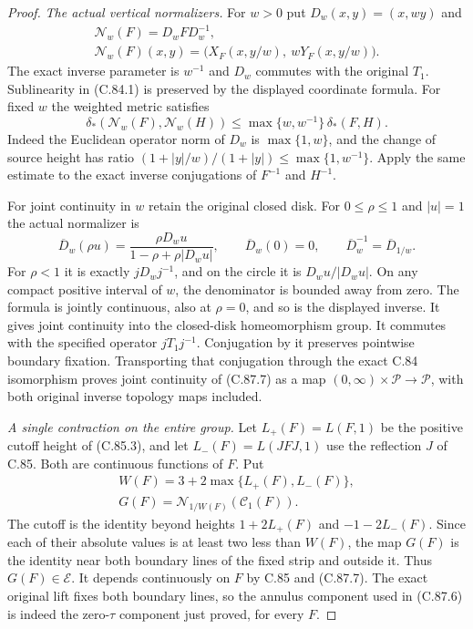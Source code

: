 \begin{proof}
\emph{The actual vertical normalizers.}
For $w>0$ put $D_w(x,y)=(x,wy)$
and
\[
 \begin{gathered}
 \mathcal N_w(F)=D_wFD_w^{-1},\\
 \mathcal N_w(F)(x,y)
       =\bigl(X_F(x,y/w),\ wY_F(x,y/w)\bigr).
 \end{gathered}                                                   \tag{C.87.7}
\]
The exact inverse parameter is
$w^{-1}$ and $D_w$ commutes with
the original $T_1$.
Sublinearity in (C.84.1) is
preserved by the displayed
coordinate formula. For fixed
$w$ the weighted metric satisfies
\[
 \delta_*(\mathcal N_w(F),\mathcal N_w(H))
                  \leq\max\{w,w^{-1}\}\,\delta_*(F,H).
                                                               \tag{C.87.8}
\]
Indeed the Euclidean operator
norm of $D_w$ is $\max\{1,w\}$,
and the change of source height
has ratio
$(1+|y|/w)/(1+|y|)\leq\max\{1,w^{-1}\}$.
Apply the same estimate to the
exact inverse conjugations of
$F^{-1}$ and $H^{-1}$.

For joint continuity in $w$
retain the original closed disk.
For $0\leq\rho\leq1$ and $|u|=1$
the actual normalizer is
\[
 \overline D_w(\rho u)
    =\frac{\rho D_wu}{1-\rho+\rho|D_wu|},\qquad
 \overline D_w(0)=0,\qquad
 \overline D_w^{-1}=\overline D_{1/w}.
                                                               \tag{C.87.9}
\]
For $\rho<1$ it is exactly
$jD_wj^{-1}$, and on the circle
it is $D_wu/|D_wu|$.
On any compact positive interval
of $w$, the denominator is
bounded away from zero. The
formula is jointly continuous,
also at $\rho=0$, and so is the
displayed inverse. It gives
joint continuity into the
closed-disk homeomorphism group.
It commutes with the specified
operator $jT_1j^{-1}$. Conjugation
by it preserves pointwise
boundary fixation. Transporting
that conjugation through the
exact C.84 isomorphism proves
joint continuity of (C.87.7)
as a map $(0,\infty)\times
\mathscr P\to\mathscr P$,
with both original inverse
topology maps included.

\emph{A single contraction on the entire group.}
Let $L_+(F)=L(F,1)$ be the
positive cutoff height of
(C.85.3), and let
$L_-(F)=L(JFJ,1)$ use the
reflection $J$ of C.85.
Both are continuous functions
of $F$. Put
\[
 \begin{gathered}
 W(F)=3+2\max\{L_+(F),L_-(F)\},\\
 G(F)=\mathcal N_{1/W(F)}(\mathcal C_1(F)).
 \end{gathered}                                                   \tag{C.87.10}
\]
The cutoff is the identity beyond
heights $1+2L_+(F)$ and
$-1-2L_-(F)$. Since each of their
absolute values is at least two
less than $W(F)$, the map
$G(F)$ is the identity near
both boundary lines of the
fixed strip and outside it.
Thus $G(F)\in\mathscr E$.
It depends continuously on
$F$ by C.85 and (C.87.7).
The exact original lift fixes
both boundary lines, so the
annulus component used in
(C.87.6) is indeed the
zero-$\tau$ component just
proved, for every $F$.


\end{proof}
